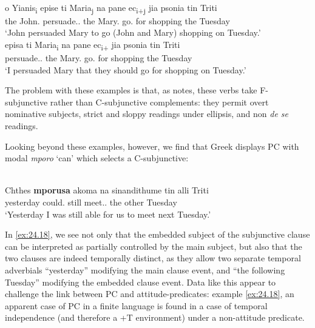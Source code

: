 \documentclass[output=paper]{langsci/langscibook}
\begin{document}
\ea%
    \label{ex:24.16}\\
	\gll o Yianis\textsubscript{i}       epise         ti Maria\textsubscript{j}       na     pane ec\textsubscript{i+j} jia psonia tin Triti\\
		the John.\Nom{}   persuade.\Tsg.\Pst{}    the Mary.\Acc{}    \Sbjv{} go.\Tpl{} {} for shopping the Tuesday\\
	\glt ‘John persuaded Mary to go (John and Mary) shopping on Tuesday.’
\ex%
    \label{ex:24.17}  \parencite[(34a), ((35a)]{Spyropoulos2007b}\\
	\gll episa       ti Maria\textsubscript{i}   na   pane ec\textsubscript{i+}   jia psonia tin Triti\\
        persuade.\Fsg{}.\Pst{}   the Mary.\Acc{} \Sbjv{} go.\Tpl{} {}  for shopping the Tuesday\\
	\glt ‘I persuaded Mary that they should go for shopping on Tuesday.’\\
\z

The problem with these examples is that, as \citet{Varlokosta1994} notes, these
verbs take F-subjunctive rather than C-subjunctive complements: they permit
overt nominative subjects, strict and sloppy readings under
ellipsis, and non \emph{de se} readings.

Looking beyond these examples, however, we find that Greek displays
\gls{PC} with modal \emph{mporo} ‘can’ which
selects a C-subjunctive:

\ea%
    \label{ex:24.18} \\
	\gll Chthes   \textbf{mporusa}  akoma na     sinandithume tin alli Triti\\
        yesterday  could.\Fsg{}  still     \Sbjv{} meet.\Sbjv{}.\Fpl{}  the other Tuesday\\
	\glt ‘Yesterday I was still able for us to meet next Tuesday.’
\z

In \eqref{ex:24.18}, we see not only that the embedded subject of the subjunctive clause
can be interpreted as partially controlled by the main subject, but also that
the two clauses are indeed temporally distinct, as they allow two separate
temporal adverbials “yesterday” modifying the main clause event, and “the
following Tuesday” modifying the embedded clause event. Data like this appear
to challenge the link between \gls{PC} and
attitude-predicates: example \eqref{ex:24.18}, an apparent case of
\gls{PC} in a finite  language is found in a
case of temporal independence (and therefore a +T environment) under a
non-attitude predicate.
\end{document}
